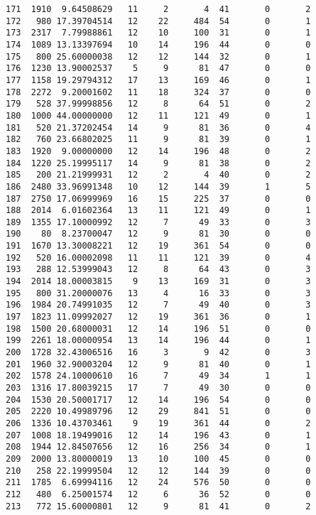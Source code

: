 \documentclass[
  letterpaper,
  DIV=11,
  numbers=noendperiod]{scrreprt}
\begin{document}
\begin{verbatim}
171  1910  9.64508629   11     2       4  41       0       2
172   980 17.39704514   12    22     484  54       0       1
173  2317  7.79988861   12    10     100  31       0       1
174  1089 13.13397694   10    14     196  44       0       0
175   800 25.60000038   12    12     144  32       0       1
176  1230 13.90002537    5     9      81  47       0       0
177  1158 19.29794312   17    13     169  46       0       1
178  2272  9.20001602   11    18     324  37       0       0
179   528 37.99998856   12     8      64  51       0       2
180  1000 44.00000000   12    11     121  49       0       1
181   520 21.37202454   14     9      81  36       0       4
182   760 23.66802025   11     9      81  39       0       1
183  1920  9.00000000   12    14     196  48       0       2
184  1220 25.19995117   14     9      81  38       0       2
185   200 21.21999931   12     2       4  40       0       2
186  2480 33.96991348   10    12     144  39       1       5
187  2750 17.06999969   16    15     225  37       0       0
188  2014  6.01602364   13    11     121  49       0       1
189  1355 17.10000992   12     7      49  33       0       3
190    80  8.23700047   12     9      81  30       0       0
191  1670 13.30008221   12    19     361  54       0       0
192   520 16.00002098   11    11     121  39       0       4
193   288 12.53999043   12     8      64  43       0       3
194  2014 18.00003815    9    13     169  31       0       3
195   800 31.20000076   13     4      16  33       0       3
196  1984 20.74991035   12     7      49  40       0       3
197  1823 11.09992027   12    19     361  36       0       1
198  1500 20.68000031   12    14     196  51       0       0
199  2261 18.00000954   13    14     196  44       0       1
200  1728 32.43006516   16     3       9  42       0       3
201  1960 32.90003204   12     9      81  40       0       1
202  1578 24.10000610   16     7      49  34       1       1
203  1316 17.80039215   17     7      49  30       0       0
204  1530 20.50001717   12    14     196  54       0       0
205  2220 10.49989796   12    29     841  51       0       0
206  1336 10.43703461    9    19     361  44       0       2
207  1008 18.19499016   12    14     196  43       0       1
208  1944 12.84507656   12    16     256  34       0       1
209  2000 13.80000019   13    10     100  45       0       0
210   258 22.19999504   12    12     144  39       0       0
211  1785  6.69994116   12    24     576  50       0       0
212   480  6.25001574   12     6      36  52       0       0
213   772 15.60000801   12     9      81  41       0       2

\end{verbatim}
\end{document}
